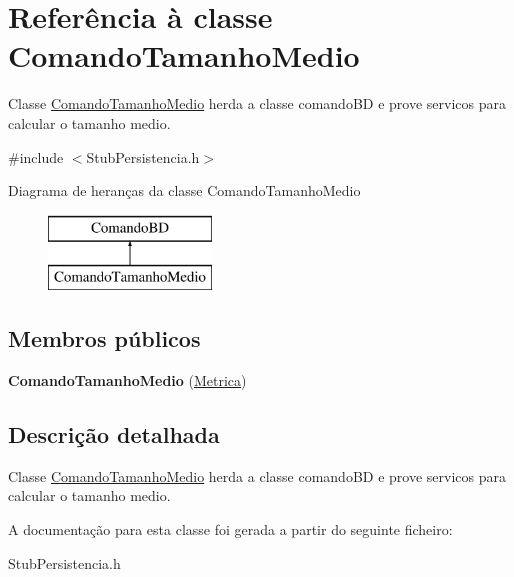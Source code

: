 \hypertarget{class_comando_tamanho_medio}{
\section{\-Referência à classe \-Comando\-Tamanho\-Medio}
\label{class_comando_tamanho_medio}
}


\-Classe \hyperlink{class_comando_tamanho_medio}{\-Comando\-Tamanho\-Medio} herda a classe comando\-B\-D e prove servicos para calcular o tamanho medio.  




{\ttfamily \#include $<$\-Stub\-Persistencia.\-h$>$}

\-Diagrama de heranças da classe \-Comando\-Tamanho\-Medio\begin{figure}[H]
\begin{center}
\leavevmode
\includegraphics[height=2.000000cm]{class_comando_tamanho_medio}
\end{center}
\end{figure}
\subsection*{\-Membros públicos}
\begin{DoxyCompactItemize}
\item 
\hypertarget{class_comando_tamanho_medio_ac07fbe0ba5eea03efb39cd6cd1deb2e2}{
{\bfseries \-Comando\-Tamanho\-Medio} (\hyperlink{class_metrica}{\-Metrica})}
\label{class_comando_tamanho_medio_ac07fbe0ba5eea03efb39cd6cd1deb2e2}

\end{DoxyCompactItemize}


\subsection{\-Descrição detalhada}
\-Classe \hyperlink{class_comando_tamanho_medio}{\-Comando\-Tamanho\-Medio} herda a classe comando\-B\-D e prove servicos para calcular o tamanho medio. 

\-A documentação para esta classe foi gerada a partir do seguinte ficheiro\-:\begin{DoxyCompactItemize}
\item 
\-Stub\-Persistencia.\-h\end{DoxyCompactItemize}
